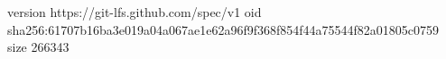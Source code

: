 version https://git-lfs.github.com/spec/v1
oid sha256:61707b16ba3e019a04a067ae1e62a96f9f368f854f44a75544f82a01805c0759
size 266343
